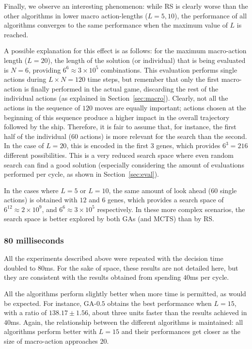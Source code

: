 \documentclass{sig-alternate}
\begin{document}
Finally, we observe an interesting phenomenon: while RS is clearly worse than the other algorithms in lower macro action-lengths ($L = 5,10$), the performance of all algorithms converges to the same performance when the maximum value of $L$ is reached. 

A possible explanation for this effect is as follows: for the maximum macro-action length ($L=20$), the length of the solution (or individual) that is being evaluated is $N=6$, providing $6^{6} \approx 3 \times 10^5$ combinations. This evaluation performs single actions during $L \times N = 120$ time steps, but remember that only the first macro-action is finally performed in the actual game, discarding the rest of the individual actions (as explained in Section~\ref{sec:macro}). Clearly, not all the actions in the sequence of $120$ moves are equally important; actions chosen at the beginning of this sequence produce a higher impact in the overall trajectory followed by the ship. Therefore, it is fair to assume that, for instance, the first half of the individual ($60$ actions) is more relevant for the search than the second. In the case of $L=20$, this is encoded in the first $3$ genes, which provides $6^{3} = 216$ different possibilities.  This is a very reduced search space where even random search can find a good solution (especially considering the amount of evaluations performed per cycle, as shown in Section~\ref{sec:eval}).

In the cases where $L=5$ or $L=10$, the same amount of look ahead ($60$ single actions) is obtained with $12$ and $6$ genes, which provides a search space of $6^{12} \approx 2 \times 10^9$, and $6^{6} \approx 3 \times 10^5$ respectively. In these more complex scenarios, the search space is better explored by both GAs (and MCTS) than by RS.

\subsubsection{80 milliseconds} \label{sec:eighty}

All the experiments described above were repeated with the decision time doubled to $80$ms. For the sake of space, these results are not detailed here, but they are consistent with the results obtained from spending $40$ms per cycle.

All the algorithms perform slightly better when more time is permitted, as would be expected. For instance, GA-$0.5$ obtains the best performance when $L=15$, with a ratio of $138.17 \pm 1.56$, about three units faster than the results achieved in $40$ms. Again, the relationship between the different algorithms is maintained: all algorithms perform better with $L=15$ and their performances get closer as the size of macro-action approaches $20$.
\end{document}
